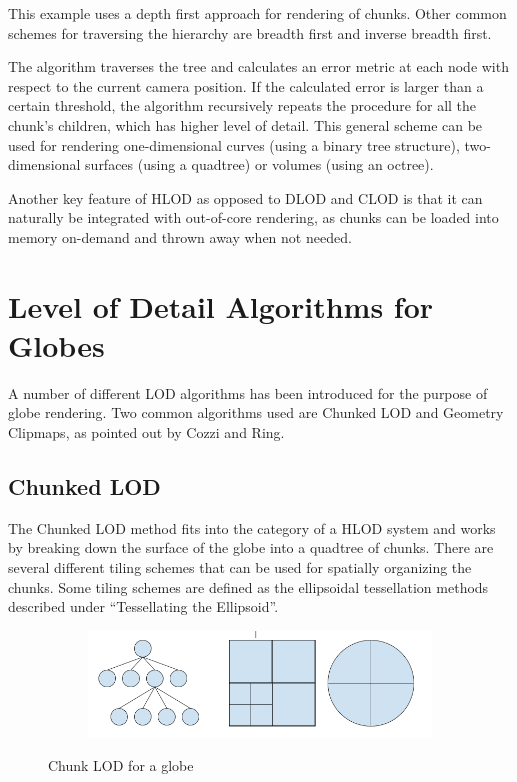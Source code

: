 This example uses a depth first approach for rendering of chunks. Other common schemes for traversing the hierarchy are breadth first and inverse breadth first.

The algorithm traverses the tree and calculates an error metric at each node with respect to the current camera position. If the calculated error is larger than a certain threshold, the algorithm recursively repeats the procedure for all the chunk's children, which has higher level of detail. This general scheme can be used for rendering one-dimensional curves (using a binary tree structure), two-dimensional surfaces (using a quadtree) or volumes (using an octree).

Another key feature of HLOD as opposed to DLOD and CLOD is that it can naturally be integrated with out-of-core rendering, as chunks can be loaded into memory on-demand and thrown away when not needed.



\section{Level of Detail Algorithms for Globes}
A number of different LOD algorithms has been introduced for the purpose of globe rendering. Two common algorithms used are Chunked LOD and Geometry Clipmaps, as pointed out by Cozzi and Ring\cite{cozzi11}.

\subsection{Chunked LOD}
The Chunked LOD method fits into the category of a HLOD system and works by breaking down the surface of the globe into a quadtree of chunks. There are several different tiling schemes that can be used for spatially organizing the chunks. Some tiling schemes are defined as the ellipsoidal tessellation methods described under ``Tessellating the Ellipsoid''. 

\begin{figure}[htbp]
    \centering
    \begin{subfigure}[bt]{0.4\textwidth}
        \includegraphics[width=\textwidth]{figures/chunkedlod/chunkedlodglobe.png}
    \end{subfigure}
    \caption{Chunk LOD for a globe}
    \label{fig:chunkedlod}
\end{figure}


